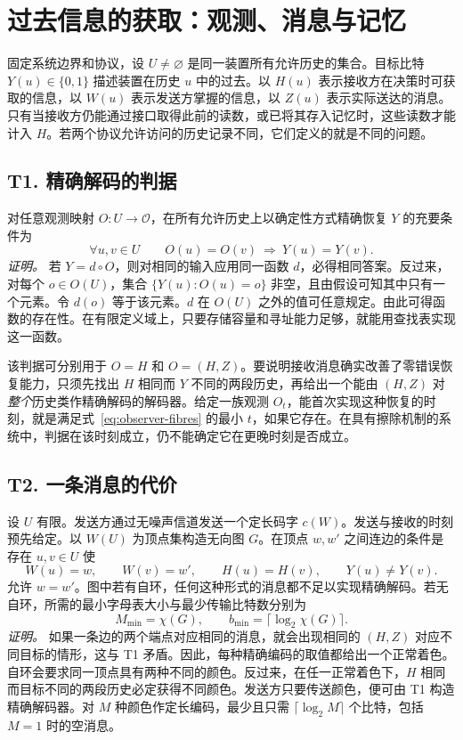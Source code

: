 \section{过去信息的获取：观测、消息与记忆}
\label{sec:observer-theory}

固定系统边界和协议，设 $U\ne\varnothing$ 是同一装置所有允许历史的集合。目标比特 $Y(u)\in\{0,1\}$ 描述装置在历史 $u$ 中的过去。以 $H(u)$ 表示接收方在决策时可获取的信息，以 $W(u)$ 表示发送方掌握的信息，以 $Z(u)$ 表示实际送达的消息。只有当接收方仍能通过接口取得此前的读数，或已将其存入记忆时，这些读数才能计入 $H$。若两个协议允许访问的历史记录不同，它们定义的就是不同的问题。

\subsection{T1. 精确解码的判据}
\label{thm:observer-t1}

对任意观测映射 $O:U\to\mathcal O$，在所有允许历史上以确定性方式精确恢复 $Y$ 的充要条件为
\begin{equation}
 \forall u,v\in U\qquad O(u)=O(v)\ \Longrightarrow\ Y(u)=Y(v).
 \label{eq:observer-fibres}
\end{equation}
\emph{证明。} 若 $Y=d\circ O$，则对相同的输入应用同一函数 $d$，必得相同答案。反过来，对每个 $o\in O(U)$，集合 $\{Y(u):O(u)=o\}$ 非空，且由假设可知其中只有一个元素。令 $d(o)$ 等于该元素。$d$ 在 $O(U)$ 之外的值可任意规定。由此可得函数的存在性。在有限定义域上，只要存储容量和寻址能力足够，就能用查找表实现这一函数。

该判据可分别用于 $O=H$ 和 $O=(H,Z)$。要说明接收消息确实改善了零错误恢复能力，只须先找出 $H$ 相同而 $Y$ 不同的两段历史，再给出一个能由 $(H,Z)$ 对\emph{整个}历史类作精确解码的解码器。给定一族观测 $O_t$，能首次实现这种恢复的时刻，就是满足式~\eqref{eq:observer-fibres} 的最小 $t$，如果它存在。在具有擦除机制的系统中，判据在该时刻成立，仍不能确定它在更晚时刻是否成立。

\subsection{T2. 一条消息的代价}
\label{thm:observer-t2}

设 $U$ 有限。发送方通过无噪声信道发送一个定长码字 $c(W)$。发送与接收的时刻预先给定。以 $W(U)$ 为顶点集构造无向图 $G$。在顶点 $w,w'$ 之间连边的条件是存在 $u,v\in U$ 使
\[
 W(u)=w,\qquad W(v)=w',\qquad H(u)=H(v),\qquad Y(u)\ne Y(v).
\]
允许 $w=w'$。图中若有自环，任何这种形式的消息都不足以实现精确解码。若无自环，所需的最小字母表大小与最少传输比特数分别为
\[
 M_{\min}=\chi(G),\qquad b_{\min}=\lceil\log_2\chi(G)\rceil .
\]
\emph{证明。} 如果一条边的两个端点对应相同的消息，就会出现相同的 $(H,Z)$ 对应不同目标的情形，这与 T1 矛盾。因此，每种精确编码的取值都给出一个正常着色。自环会要求同一顶点具有两种不同的颜色。反过来，在任一正常着色下，$H$ 相同而目标不同的两段历史必定获得不同颜色。发送方只要传送颜色，便可由 T1 构造精确解码器。对 $M$ 种颜色作定长编码，最少且只需 $\lceil\log_2 M\rceil$ 个比特，包括 $M=1$ 时的空消息。

